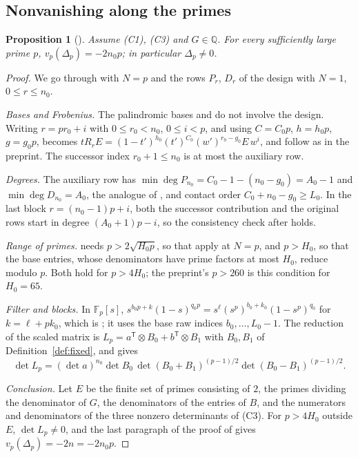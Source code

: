 \documentclass[11pt]{article}
\newtheorem{proposition}[theorem]{Proposition}
\theoremstyle{definition}
\begin{document}
\subsection{Nonvanishing along the primes}\label{sec:nonvan}

\begin{proposition}[{\cite[Prop.~4.1]{OAI}}]\label{prop:nonzero}
Assume (C1), (C3) and $G\in\mathbb Q$. For every sufficiently large prime $p$, $v_p(\Delta_p)=-2n_0p$; in particular $\Delta_p\ne0$.
\end{proposition}

\begin{proof}
We go through \cite[Sec.~4]{OAI} with $N=p$ and the rows $P_r$, $D_r$ of the design with $N=1$, $0\le r\le n_0$.

\emph{Bases and Frobenius.} The palindromic bases and \cite[Eqs.~(49)--(51)]{OAI} do not involve the design. Writing $r=pr_0+i$ with $0\le r_0<n_0$, $0\le i<p$, and using $C=C_0p$, $h=h_0p$, $g=g_0p$, \cite[Eq.~(52)]{OAI} becomes $tR_rE=(1-t')^{h_0}(t')^{C_0}(w')^{r_0-g_0}E\,w^i$, and \cite[Eqs.~(53)--(55)]{OAI} follow as in the preprint. The successor index $r_0+1\le n_0$ is at most the auxiliary row.

\emph{Degrees.} The auxiliary row has $\min\deg P_{n_0}=C_0-1-(n_0-g_0)=A_0-1$ and $\min\deg D_{n_0}=A_0$, the analogue of \cite[Eq.~(56)]{OAI}, and contact order $C_0+n_0-g_0\ge L_0$. In the last block $r=(n_0-1)p+i$, both the successor contribution and the original rows start in degree $(A_0+1)p-i$, so the consistency check after \cite[Eq.~(56)]{OAI} holds.

\emph{Range of primes.} \cite[Sec.~4.3]{OAI} needs $p>2\sqrt{H_0p}$, so that \cite[Eqs.~(31), (36)]{OAI} apply at $N=p$, and $p>H_0$, so that the base entries, whose denominators have prime factors at most $H_0$, reduce modulo $p$. Both hold for $p>4H_0$; the preprint's $p>260$ is this condition for $H_0=65$.

\emph{Filter and blocks.} In $\mathbb F_p[s]$, $s^{b_0p+k}(1-s)^{q_0p}=s^\ell(s^p)^{b_0+k_0}(1-s^p)^{q_0}$ for $k=\ell+pk_0$, which is \cite[Eq.~(58)]{OAI}; it uses the base raw indices $b_0,\dots,L_0-1$. The reduction of the scaled matrix is $L_p=a^{\mathsf T}\otimes B_0+b^{\mathsf T}\otimes B_1$ with $B_0,B_1$ of Definition~\ref{def:fixed}, and \cite[Eq.~(60)]{OAI} gives
\[
\det L_p=(\det a)^{n_0}\det B_0\,\det(B_0+B_1)^{(p-1)/2}\det(B_0-B_1)^{(p-1)/2}.
\]

\emph{Conclusion.} Let $E$ be the finite set of primes consisting of $2$, the primes dividing the denominator of $G$, the denominators of the entries of $B$, and the numerators and denominators of the three nonzero determinants of (C3). For $p>4H_0$ outside $E$, $\det L_p\ne0$, and the last paragraph of the proof of \cite[Prop.~4.1]{OAI} gives $v_p(\Delta_p)=-2n=-2n_0p$.
\end{proof}
\end{document}
